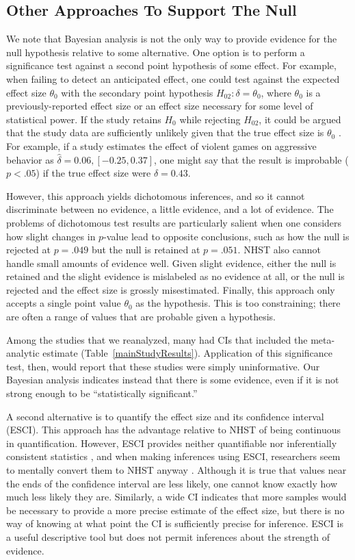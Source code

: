 \documentclass[man]{apa6}
\begin{document}
\subsection{Other Approaches To Support The Null}
We note that Bayesian analysis is not the only way to provide evidence for the null hypothesis relative to some alternative.  One option is to perform a significance test against a second point hypothesis of some effect. For example, when failing to detect an anticipated effect, one could test against the expected effect size $\theta_0$ with the secondary point hypothesis $H_{02}: \delta = \theta_0$, where $\theta_0$ is a previously-reported effect size or an effect size necessary for some level of statistical power. If the study retains $H_0$ while rejecting $H_{02}$, it could be argued that the study data are sufficiently unlikely given that the true effect size is $\theta_0$ \citep[e.g.,][]{Simonsohn:etal:2014}. For example, if a study estimates the effect of violent games on aggressive behavior as $\hat{\delta} = 0.06, [-0.25, 0.37]$, one might say that the result is improbable ($p < .05$) if the true effect size were $\delta = 0.43$.

However, this approach yields dichotomous inferences, and so it cannot discriminate between no evidence, a little evidence, and a lot of evidence. The problems of dichotomous test results are particularly salient when one considers how slight changes in $p$-value lead to opposite conclusions, such as how the null is rejected at $p = .049$ but the null is retained at $p = .051$. NHST also cannot handle small amounts of evidence well. Given slight evidence, either the null is retained and the slight evidence is mislabeled as no evidence at all, or the null is rejected and the effect size is grossly misestimated. Finally, this approach only accepts a single point value $\theta_0$ as the hypothesis. This is too constraining; there are often a range of values that are probable given a hypothesis. 

Among the studies that we reanalyzed, many had CIs that included the meta-analytic estimate (Table~\ref{mainStudyResults}). Application of this significance test, then, would report that these studies were simply uninformative. Our Bayesian analysis indicates instead that there is some evidence, even if it is not strong enough to be ``statistically significant.''   

A second alternative is to quantify the effect size and its confidence interval (ESCI). This approach has the advantage relative to NHST of being continuous in quantification.  However, ESCI provides neither quantifiable nor inferentially consistent statistics \citep[see][]{Morey:etal:2014}, and when making inferences using ESCI, researchers seem to mentally convert them to NHST anyway \citep{Hoekstra:etal:2014}.  Although it is true that values near the ends of the confidence interval are less likely, one cannot know exactly how much less likely they are. Similarly, a wide CI indicates that more samples would be necessary to provide a more precise estimate of the effect size, but there is no way of knowing at what point the CI is sufficiently precise for inference. ESCI is a useful descriptive tool but does not permit inferences about the strength of evidence.
\end{document}
